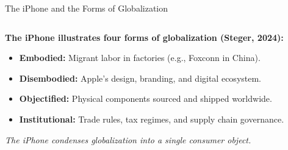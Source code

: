 \documentclass{beamer}
\begin{document}
\begin{frame}{The iPhone and the Forms of Globalization}

\small

\begin{columns}[T,onlytextwidth]

    \begin{column}{0.58\textwidth}
        \textbf{The iPhone illustrates four forms of globalization (Steger, 2024):}
        \begin{itemize}
            \item \textbf{Embodied:} Migrant labor in factories (e.g., Foxconn in China).
            \item \textbf{Disembodied:} Apple’s design, branding, and digital ecosystem.
            \item \textbf{Objectified:} Physical components sourced and shipped worldwide.
            \item \textbf{Institutional:} Trade rules, tax regimes, and supply chain governance.
        \end{itemize}

        \vspace{0.5em}
        \textit{The iPhone condenses globalization into a single consumer object.}
    \end{column}

\end{columns}
\end{frame}
\end{document}
